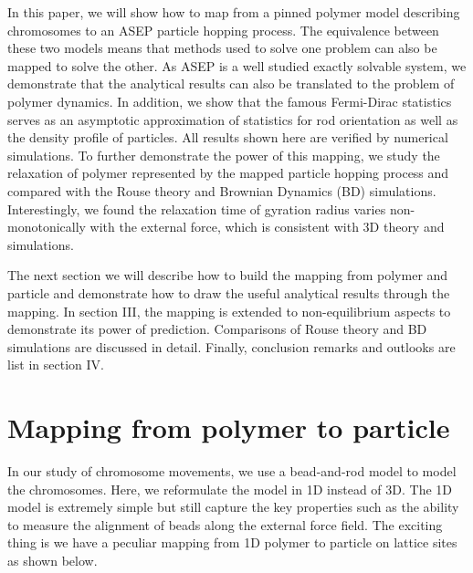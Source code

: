 \documentclass[aps,showpacs,twocolumn,floatfix,prx,superscriptaddress]{revtex4-1}
\begin{document}
In this paper, we will show how to map from a pinned polymer model describing
chromosomes to an ASEP particle hopping process. The equivalence between these
two models means that methods used to solve one problem can also be mapped to
solve the other. As ASEP is a well studied exactly solvable system, we
demonstrate that the analytical results can also be translated to the problem of
polymer dynamics. In addition, we show that the famous Fermi-Dirac statistics
serves as an asymptotic approximation of statistics for rod orientation as well
as the density profile of particles. All results shown here are verified by
numerical simulations. To further demonstrate the power of this mapping, we
study the relaxation of polymer represented by the mapped particle hopping
process and compared with the Rouse theory and Brownian Dynamics (BD)
simulations.  Interestingly, we found the relaxation time of gyration radius
varies non-monotonically with the external force, which is consistent with 3D
theory and simulations.

The next section we will describe how to build the mapping from polymer and
particle and demonstrate how to draw the useful analytical results through the
mapping. In section III, the mapping is extended to non-equilibrium aspects to
demonstrate its power of prediction. Comparisons of Rouse theory and BD
simulations are discussed in detail. Finally, conclusion remarks and outlooks
are list in section IV. 


\section{Mapping from polymer to particle}
In our study of chromosome movements, we use a bead-and-rod model to model the
chromosomes. Here, we reformulate the model in 1D instead of 3D. The 1D model
is extremely simple but still capture the key properties such as the ability to
measure the  alignment of beads along the external force field.  The exciting
thing is we have a peculiar mapping from 1D polymer to particle on lattice sites
as shown below.  
\end{document}

